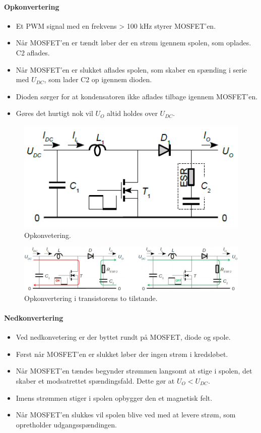 \documentclass[danish]{article}
\begin{document}
\paragraph{Opkonvertering}
\begin{itemize}
	\item Et PWM signal med en frekvens > 100 kHz styrer MOSFET’en.
	\item Når MOSFET'en er tændt løber der en strøm igennem spolen, som oplades. C2 aflades. 
	\item Når MOSFET'en er slukket aflades spolen, som skaber en spænding i serie med $U_{DC}$, som lader C2 op igennem dioden.
	\item Dioden sørger for at kondensatoren ikke aflades tilbage igennem MOSFET’en.
	\item Gøres det hurtigt nok vil $U_O$ altid holdes over $U_{DC}.$
\end{itemize}

\begin{figure} [H]
	\centering
	\includegraphics[width=0.6\linewidth]{graphics/opkonvertering}
	\caption{Opkonvetering.}
	\label{fig:opkonvertering}
\end{figure}

\begin{figure} [H]
	\centering
	\includegraphics[width=\linewidth]{graphics/dcdc_opkonvertering}
	\caption{Opkonvertering i transistorens to tilstande.}
	\label{fig:dcdc_opkonvertering}
\end{figure}

\paragraph{Nedkonvertering}
\begin{itemize}
	\item Ved nedkonvetering er der byttet rundt på MOSFET, diode og
	spole.
	\item Først når MOSFET’en er slukket løber der ingen strøm i kredsløbet.
	\item Når MOSFET’en tændes begynder strømmen langsomt at stige i spolen, det skaber et modsatrettet spændingsfald. Dette gør at $U_O < U_{DC}$.
	\item Imens strømmen stiger i spolen opbygger den et magnetisk felt.
	\item Når MOSFET’en slukkes vil spolen blive ved med at levere strøm, som opretholder udgangsspændingen.
\end{itemize}
\end{document}

